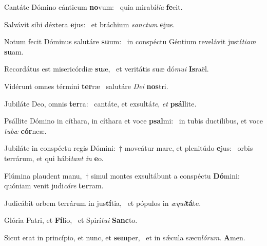 \item Cantáte Dómino cánticum \textbf{no}vum:~\psstar{} quia mirabí\textit{lia} \textbf{fe}cit.
\item Salvávit sibi déxtera \textbf{e}jus:~\psstar{} et bráchium \textit{sanctum} \textbf{e}jus.
\item Notum fecit Dóminus salutáre \textbf{su}um:~\psstar{} in conspéctu Géntium revelávit justí\textit{tiam} \textbf{su}am.
\item Recordátus est misericórdiæ \textbf{su}æ,~\psstar{} et veritátis suæ dó\textit{mui} \textbf{Is}raël.
\item Vidérunt omnes términi \textbf{ter}ræ~\psstar{} salutáre \textit{Dei} \textbf{nos}tri.
\item Jubiláte Deo, omnis \textbf{ter}ra:~\psstar{} cantáte, et exsultá\textit{te}, \textit{et} \textbf{psál}lite.
\item Psállite Dómino in cíthara, in cíthara et voce \textbf{psal}mi:~\psstar{} in tubis ductílibus, et voce \textit{tubæ} \textbf{cór}neæ.
\item Jubiláte in conspéctu regis Dómini:~† moveátur mare, et plenitúdo \textbf{e}jus:~\psstar{} orbis terrárum, et qui hábi\textit{tant} \textit{in} \textbf{e}o.
\item Flúmina plaudent manu,~† simul montes exsultábunt a conspéctu \textbf{Dó}mini:~\psstar{} quóniam venit judi\textit{cáre} \textbf{ter}ram.
\item Judicábit orbem terrárum in jus\textbf{tí}tia,~\psstar{} et pópulos in \textit{æqui}\textbf{tá}te.
\item Glória Patri, et \textbf{Fí}lio,~\psstar{} et Spirí\textit{tui} \textbf{Sanc}to.
\item Sicut erat in princípio, et nunc, et \textbf{sem}per,~\psstar{} et in sǽcula sæcu\textit{lórum}. \textbf{A}men.
